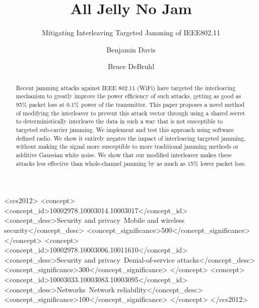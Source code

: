 \documentclass[sigconf]{acmart}
\begin{document}
\title{All Jelly No Jam}
\subtitle{Mitigating Interleaving Targeted Jamming of IEEE802.11}

\author{Benjamin Davis}

\author{Bruce DeBruhl}



\begin{abstract}
  Recent jamming attacks against IEEE 802.11 (WiFi) have targeted the interleaving mechanism to greatly improve the power efficiency of such attacks, getting as good as 95\% packet loss at 0.1\% power of the transmitter. This paper proposes a novel method of modifying the interleaver to prevent this attack vector through using a shared secret to deterministically interleave the data in such a way that is not susceptible to targeted sub-carrier jamming. We implement and test this approach using software defined radio. We show it entirely negates the impact of interleaving targeted jamming, without making the signal more susceptible to more traditional jamming methods or additive Gaussian white noise. We show that our modified interleaver makes these attacks less effective than whole-channel jamming by as much as 15\% lower packet loss.
\end{abstract}

\begin{CCSXML}
<ccs2012>
<concept>
<concept_id>10002978.10003014.10003017</concept_id>
<concept_desc>Security and privacy~Mobile and wireless security</concept_desc>
<concept_significance>500</concept_significance>
</concept>
<concept>
<concept_id>10002978.10003006.10011610</concept_id>
<concept_desc>Security and privacy~Denial-of-service attacks</concept_desc>
<concept_significance>300</concept_significance>
</concept>
<concept>
<concept_id>10003033.10003083.10003095</concept_id>
<concept_desc>Networks~Network reliability</concept_desc>
<concept_significance>100</concept_significance>
</concept>
</ccs2012>
\end{CCSXML}
\end{document}
